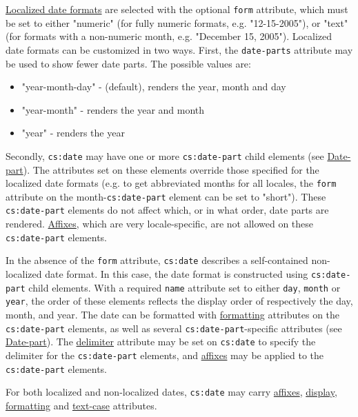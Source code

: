 \protect\hyperlink{localized-date-formats}{Localized date formats} are
selected with the optional \texttt{form} attribute, which must be set to
either "numeric" (for fully numeric formats, e.g. "12-15-2005"), or
"text" (for formats with a non-numeric month, e.g. "December 15, 2005").
Localized date formats can be customized in two ways. First, the
\texttt{date-parts} attribute may be used to show fewer date parts. The
possible values are:

\begin{itemize}
\tightlist
\item
  "year-month-day" - (default), renders the year, month and day
\item
  "year-month" - renders the year and month
\item
  "year" - renders the year
\end{itemize}

Secondly, \texttt{cs:date} may have one or more \texttt{cs:date-part}
child elements (see \protect\hyperlink{date-part}{Date-part}). The
attributes set on these elements override those specified for the
localized date formats (e.g. to get abbreviated months for all locales,
the \texttt{form} attribute on the month-\texttt{cs:date-part} element
can be set to "short"). These \texttt{cs:date-part} elements do not
affect which, or in what order, date parts are rendered.
\protect\hyperlink{affixes}{Affixes}, which are very locale-specific,
are not allowed on these \texttt{cs:date-part} elements.

In the absence of the \texttt{form} attribute, \texttt{cs:date}
describes a self-contained non-localized date format. In this case, the
date format is constructed using \texttt{cs:date-part} child elements.
With a required \texttt{name} attribute set to either \texttt{day},
\texttt{month} or \texttt{year}, the order of these elements reflects
the display order of respectively the day, month, and year. The date can
be formatted with \protect\hyperlink{formatting}{formatting} attributes
on the \texttt{cs:date-part} elements, as well as several
\texttt{cs:date-part}-specific attributes (see
\protect\hyperlink{date-part}{Date-part}). The
\protect\hyperlink{delimiter}{delimiter} attribute may be set on
\texttt{cs:date} to specify the delimiter for the \texttt{cs:date-part}
elements, and \protect\hyperlink{affixes}{affixes} may be applied to the
\texttt{cs:date-part} elements.

For both localized and non-localized dates, \texttt{cs:date} may carry
\protect\hyperlink{affixes}{affixes},
\protect\hyperlink{display}{display},
\protect\hyperlink{formatting}{formatting} and
\protect\hyperlink{text-case}{text-case} attributes.

